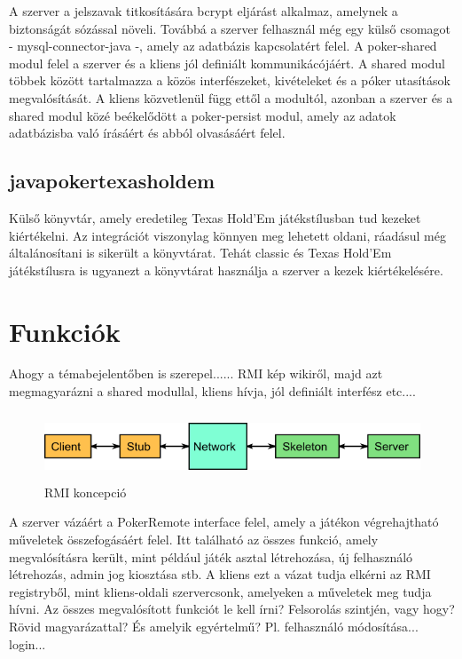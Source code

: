 A szerver a jelszavak titkosítására bcrypt eljárást alkalmaz, amelynek a biztonságát sózással növeli. Továbbá a szerver felhasznál még egy külső csomagot - mysql-connector-java -, amely az adatbázis kapcsolatért felel.
A poker-shared modul felel a szerver és a kliens jól definiált kommunikácójáért. A shared modul többek között tartalmazza a közös interfészeket, kivételeket és a póker utasítások megvalósítását. A kliens közvetlenül függ ettől a modultól, azonban a szerver és a shared modul közé beékelődött a poker-persist modul, amely az adatok adatbázisba való írásáért és abból olvasásáért felel.

\subsection{javapokertexasholdem}
Külső könyvtár, amely eredetileg Texas Hold'Em játékstílusban tud kezeket kiértékelni. Az integrációt viszonylag könnyen meg lehetett oldani, ráadásul még általánosítani is sikerült a könyvtárat. Tehát classic és Texas Hold'Em játékstílusra is ugyanezt a könyvtárat használja a szerver a kezek kiértékelésére.

\section{Funkciók}
Ahogy a témabejelentőben is szerepel...... RMI kép wikiről, majd azt megmagyarázni a shared modullal, kliens hívja, jól definiált interfész etc....
\begin{figure}[h!]
	\caption{RMI koncepció}
	\centering
	\includegraphics[width=14cm, height=2cm]{user-documentation/images/rmi.png}
\end{figure}
A szerver vázáért a PokerRemote interface felel, amely a játékon végrehajtható műveletek összefogásáért felel. Itt található az összes funkció, amely megvalósításra került, mint például játék asztal létrehozása, új felhasználó létrehozás, admin jog kiosztása stb. A kliens ezt a vázat tudja elkérni az RMI registryből, mint kliens-oldali szervercsonk, amelyeken a műveletek meg tudja hívni. Az összes megvalósított funkciót le kell írni? Felsorolás szintjén, vagy hogy? Rövid magyarázattal? És amelyik egyértelmű? Pl. felhasználó módosítása... login...

